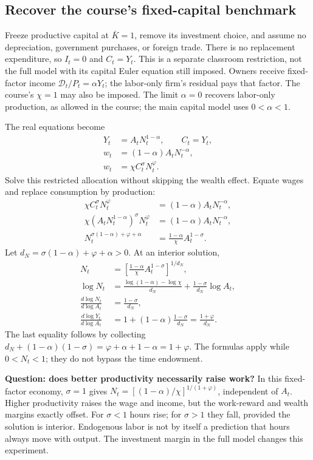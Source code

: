 \subsection{Recover the course's fixed-capital benchmark}\label{sec:rbc-fixed}

Freeze productive capital at $\bar K=1$, remove its investment choice, and
assume no depreciation, government purchases, or foreign trade. There is no
replacement expenditure, so $I_t=0$ and $C_t=Y_t$. This is a separate classroom
restriction, not the full model with its capital Euler equation still imposed.
Owners receive fixed-factor income $\mathcal D_t/P_t=\alpha Y_t$; the labor-only
firm's residual pays that factor. The course's $\chi=1$ may also be imposed.
The limit $\alpha=0$ recovers labor-only production, as allowed in the course;
the main capital model uses $0<\alpha<1$.

The real equations become
\begin{align}
Y_t&=A_tN_t^{1-\alpha},\qquad C_t=Y_t,\\
w_t&=(1-\alpha)A_tN_t^{-\alpha},\\
w_t&=\chi C_t^\sigma N_t^\varphi.
\end{align}
Solve this restricted allocation without skipping the wealth effect. Equate
wages and replace consumption by production:
\begin{align}
\chi C_t^\sigma N_t^\varphi
 &=(1-\alpha)A_tN_t^{-\alpha},\\
\chi(A_tN_t^{1-\alpha})^\sigma N_t^\varphi
 &=(1-\alpha)A_tN_t^{-\alpha},\\
N_t^{\sigma(1-\alpha)+\varphi+\alpha}
 &=\frac{1-\alpha}{\chi}A_t^{1-\sigma}.
\end{align}
Let $d_N=\sigma(1-\alpha)+\varphi+\alpha>0$. At an interior solution,
\begin{align}
N_t&=\left[\frac{1-\alpha}{\chi}A_t^{1-\sigma}\right]^{1/d_N},\\
\log N_t&=\frac{\log(1-\alpha)-\log\chi}{d_N}
              +\frac{1-\sigma}{d_N}\log A_t,\\
\frac{d\log N_t}{d\log A_t}&=\frac{1-\sigma}{d_N},\\
\frac{d\log Y_t}{d\log A_t}
 &=1+(1-\alpha)\frac{1-\sigma}{d_N}
 =\frac{1+\varphi}{d_N}.
\end{align}
The last equality follows by collecting
$d_N+(1-\alpha)(1-\sigma)=\varphi+\alpha+1-\alpha=1+\varphi$.
The formulas apply while $0<N_t<1$; they do not bypass the time endowment.

\begin{redblock}
\textbf{Question: does better productivity necessarily raise work?}
In this fixed-factor economy, $\sigma=1$ gives
$N_t=[(1-\alpha)/\chi]^{1/(1+\varphi)}$, independent of $A_t$.
Higher productivity raises the wage and income, but the work-reward and wealth
margins exactly offset. For $\sigma<1$ hours rise; for $\sigma>1$ they fall,
provided the solution is interior. Endogenous labor is not by itself a
prediction that hours always move with output. The investment margin in the
full model changes this experiment.
\end{redblock}

